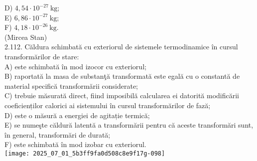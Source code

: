 D) $4,54 \cdot 10^{-27} \mathrm{~kg}$;\\
E) $6,86 \cdot 10^{-27} \mathrm{~kg}$;\\
F) $4,18 \cdot 10^{-26} \mathrm{~kg}$.\\
(Mircea Stan)\\
2.112. Căldura schimbată cu exteriorul de sistemele termodinamice în cursul transformărilor de stare:\\
A) este schimbată în mod izocor cu exteriorul;\\
B) raportată la masa de substanţă transformată este egală cu o constantă de material specifică transformării considerate;\\
C) trebuie măsurată direct, fiind imposibilă calcularea ei datorită modificării coeficienților calorici ai sistemului în cursul transformărilor de fază;\\
D) este o măsură a energiei de agitație termică;\\
E) se numeşte căldură latentă a transformării pentru că aceste transformări sunt, în general, transformări de durată;\\
F) este schimbată în mod izobar cu exteriorul.\\
\texttt{[image: 2025\_07\_01\_5b3ff9fa0d508c8e9f17g-098]}

